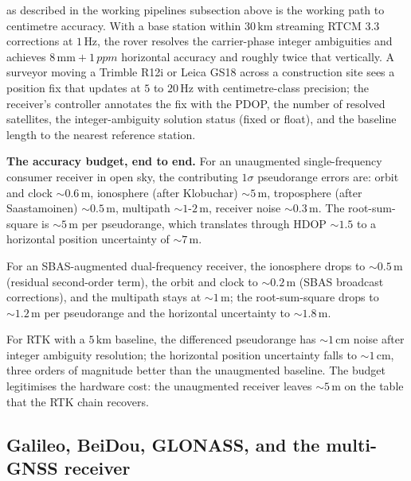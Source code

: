  as described in
the working pipelines subsection above is the working path to
centimetre accuracy. With a base station within $30 \,\si{\kilo
\meter}$ streaming RTCM 3.3 corrections at $1 \,\si{\hertz}$, the
rover resolves the carrier-phase integer ambiguities and achieves
$8 \,\si{\milli\meter} + 1 \,\si{ppm}$ horizontal accuracy and
roughly twice that vertically. A surveyor moving a Trimble R12i
or Leica GS18 across a construction site sees a position fix
that updates at $5$ to $20 \,\si{\hertz}$ with centimetre-class
precision; the receiver's controller annotates the fix with the
PDOP, the number of resolved satellites, the integer-ambiguity
solution status (fixed or float), and the baseline length to the
nearest reference station.

\textbf{The accuracy budget, end to end.} For an unaugmented
single-frequency consumer receiver in open sky, the contributing
$1\sigma$ pseudorange errors are: orbit and clock $\sim 0.6 \,\si
{\meter}$, ionosphere (after Klobuchar) $\sim 5 \,\si{\meter}$,
troposphere (after Saastamoinen) $\sim 0.5 \,\si{\meter}$,
multipath $\sim 1$-$2 \,\si{\meter}$, receiver noise $\sim 0.3
\,\si{\meter}$. The root-sum-square is $\sim 5 \,\si{\meter}$ per
pseudorange, which translates through HDOP $\sim 1.5$ to a
horizontal position uncertainty of $\sim 7 \,\si{\meter}$.

For an SBAS-augmented dual-frequency receiver, the ionosphere
drops to $\sim 0.5 \,\si{\meter}$ (residual second-order term),
the orbit and clock to $\sim 0.2 \,\si{\meter}$ (SBAS broadcast
corrections), and the multipath stays at $\sim 1 \,\si{\meter}$;
the root-sum-square drops to $\sim 1.2 \,\si{\meter}$ per
pseudorange and the horizontal uncertainty to $\sim 1.8 \,\si
{\meter}$.

For RTK with a $5 \,\si{\kilo\meter}$ baseline, the differenced
pseudorange has $\sim 1 \,\si{\centi\meter}$ noise after integer
ambiguity resolution; the horizontal position uncertainty falls
to $\sim 1 \,\si{\centi\meter}$, three orders of magnitude better
than the unaugmented baseline. The budget legitimises the
hardware cost: the unaugmented receiver leaves $\sim 5 \,\si
{\meter}$ on the table that the RTK chain recovers.

\subsection{Galileo, BeiDou, GLONASS, and the multi-GNSS
receiver}

